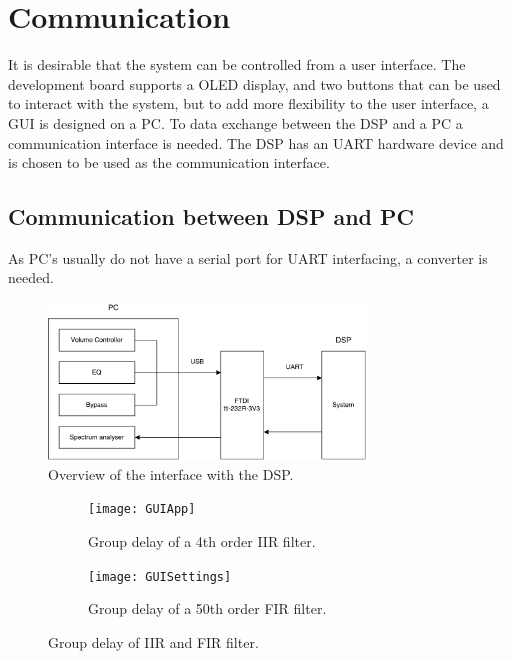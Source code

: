 \chapter{Communication}

It is desirable that the system can be controlled from a user interface. The development board supports a OLED display, and two buttons that can be used to interact with the system, but to add more flexibility to the user interface, a GUI is designed on a PC. To data exchange between the DSP and a PC a communication interface is needed. The DSP has an UART hardware device and is chosen to be used as the communication interface. 

\section{Communication between DSP and PC}

As PC's usually do not have a serial port for UART interfacing, a converter is needed.   

\begin{figure}[H]
\centering
\includegraphics[width=0.75\textwidth]{figures/communicationBlock.pdf}
\caption{Overview of the interface with the DSP.}
\label{fig:communicationBlock}
\end{figure}


\begin{figure}[H]
\centering
\begin{subfigure}[t]{0.47\textwidth}
\texttt{[image: GUIApp]}
	\caption{Group delay of a 4th order IIR filter.}
	\label{fig:GUIApp}
\end{subfigure}
\hspace{6mm} 
\begin{subfigure}[t]{0.47\textwidth}
\texttt{[image: GUISettings]}
	\caption{Group delay of a 50th order FIR filter.}
	\label{fig:GUISettings}
\end{subfigure}
\caption{Group delay of IIR and FIR filter.}
\label{fig:GUI}
\end{figure}

